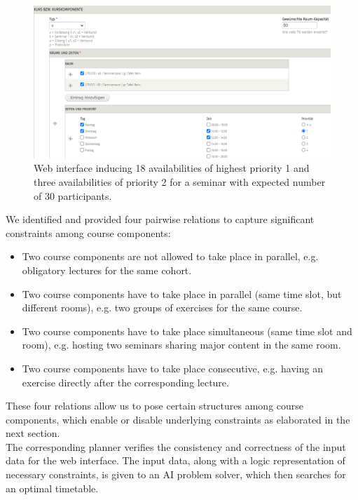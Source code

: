 \documentclass{easychair}
\begin{document}
  \begin{figure}
    \includegraphics[width=\linewidth]{webinterface}
    \caption{Web interface inducing 18 availabilities of highest priority 1 and three availabilities of priority 2 for a seminar with expected number of 30 participants.}
    \label{fig:web interface}
  \end{figure}
  We identified and provided four pairwise relations to capture significant constraints among course components:
  \begin{itemize}
    \item Two course components are not allowed to take place in parallel, e.g. obligatory lectures for the same cohort.
    \item Two course components have to take place in parallel (same time slot, but different rooms), e.g. two groups of exercises for the same course.
    \item Two course components have to take place simultaneous (same time slot and room), e.g. hosting two seminars sharing major content in the same room.
    \item Two course components have to take place consecutive, e.g. having an exercise directly after the corresponding lecture. 
  \end{itemize}
  These four relations allow us to pose certain structures among course components, which enable or disable underlying constraints as elaborated in the next section. \\ 
  The corresponding planner verifies the consistency and correctness of the input data for the web interface. 
  The input data, along with a logic representation of necessary constraints, is given to an AI problem solver, which then searches for an optimal timetable. 
\end{document}
